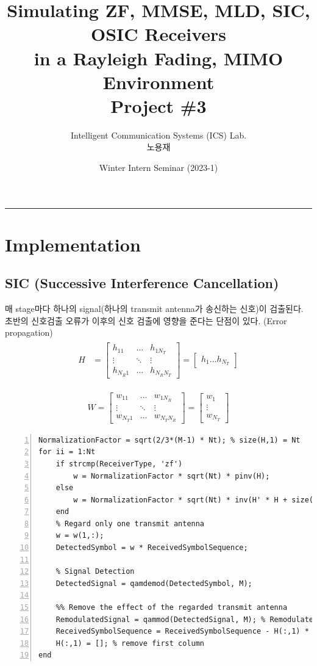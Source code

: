 \documentclass{article}
\title{Simulating ZF, MMSE, MLD, SIC, OSIC Receivers\\in a Rayleigh Fading, MIMO Environment\\
\large Project \#3}
\author{Intelligent Communication Systems (ICS) Lab.\\노용재}
\date{Winter Intern Seminar (2023-1)}
\begin{document}
\maketitle
\tableofcontents
\vspace{0.5cm}
\hrule
\vspace{0.5cm}

\section{Implementation}
\subsection{SIC (Successive Interference Cancellation)}
매 stage마다 하나의 signal(하나의 transmit antenna가 송신하는 신호)이 검출된다. 초반의 신호검출 오류가 이후의 신호 검출에 영향을 준다는 단점이 있다. (Error propagation)
\begin{gather}
	\begin{split}
		H &=
		\begin{bmatrix}
		h_{11} & \hdots & h_{1N_T}\\
		\vdots & \ddots & \vdots\\
		h_{N_R1} & \hdots & h_{N_R N_T}
		\end{bmatrix}
		=
		\begin{bmatrix}
		h_1
		\hdots
		h_{N_T}
		\end{bmatrix}
	\end{split}
\end{gather}

\begin{gather}
W=
\begin{bmatrix}
w_{11} & \hdots & w_{1N_R}\\
\vdots & \ddots & \vdots\\
w_{N_T1} & \hdots & w_{N_T N_R}
\end{bmatrix}
=
\begin{bmatrix}
w_1\\
\vdots\\
w_{N_T}
\end{bmatrix}
\end{gather}

\begin{lstlisting}[style=Matlab-editor, frame=single, numbers=left,]
NormalizationFactor = sqrt(2/3*(M-1) * Nt); % size(H,1) = Nt    
for ii = 1:Nt
    if strcmp(ReceiverType, 'zf')
        w = NormalizationFactor * sqrt(Nt) * pinv(H);
    else
        w = NormalizationFactor * sqrt(Nt) * inv(H' * H + size(H,2) / EsN0 * eye(size(H,2))) * H';
    end
    % Regard only one transmit antenna
    w = w(1,:);
    DetectedSymbol = w * ReceivedSymbolSequence;
    
    % Signal Detection
    DetectedSignal = qamdemod(DetectedSymbol, M);
    
    %% Remove the effect of the regarded transmit antenna
    RemodulatedSignal = qammod(DetectedSignal, M); % Remodulate Detected Signal
    ReceivedSymbolSequence = ReceivedSymbolSequence - H(:,1) * RemodulatedSignal / NormalizationFactor;
    H(:,1) = []; % remove first column
end
\end{lstlisting}
\end{document}
